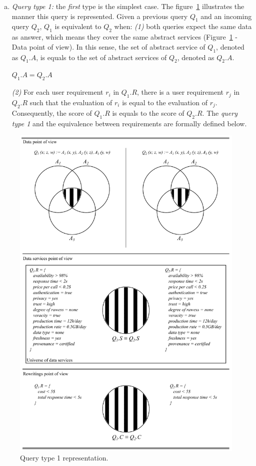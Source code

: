 \begin{enumerate}[a)]
\item \textit{Query type 1:} the \textit{first} type is the simplest case. The figure~\ref{fig:qt1} illustrates the manner this query is represented. Given a previous query $Q_{1}$ and an incoming query $Q_{2}$, $Q_{1}$ is equivalent to $Q_{2}$ when: \textit{(1)} both queries expect the same data as answer, which means they cover the same abstract services (Figure~\ref{fig:qt1} - Data point of view). In this sense, the set of abstract service of $Q_{1}$, denoted as $Q_{1}.A$, is equals to the set of abstract services of $Q_{2}$, denoted as $Q_{2}.A$.
%
\begin{center}
$Q_{1}.A = Q_{2}.A$
\end{center}
%
\textit{(2)} For each user requirement $r_{i}$ in $Q_{1}.R$, there is a user requirement $r_{j}$ in $Q_{2}.R$ such that the evaluation of $r_{i}$ is equal to the evaluation of $r_{j}$. 
Consequently, the score of $Q_{1}.R$ is equals to the score of $Q_{2}.R$. The \textit{query type 1} and the equivalence between requirements are formally defined below.
\end{enumerate}

\begin{figure}[!htbp]
\center
\includegraphics[scale=0.9]{images/QT1.pdf}
\caption{Query type 1 representation.}
\label{fig:qt1}
\end{figure}

